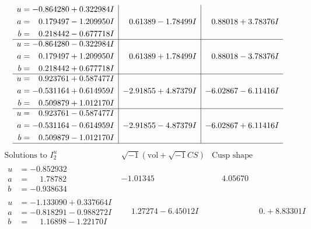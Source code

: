 \documentclass[1p]{elsarticle_modified}
\theoremstyle{definition}
\newcommand{\I}{\sqrt{-1}}
\begin{document}
$$\begin{array}{c|c|c}
\begin{aligned}
u &= -0.864280 + 0.322984 I \\
a &= \phantom{-}0.179497 - 1.209950 I \\
b &= \phantom{-}0.218442 - 0.677718 I\end{aligned}
 & \phantom{-}0.61389 - 1.78499 I & \phantom{-}0.88018 + 3.78376 I \\ \hline\begin{aligned}
u &= -0.864280 - 0.322984 I \\
a &= \phantom{-}0.179497 + 1.209950 I \\
b &= \phantom{-}0.218442 + 0.677718 I\end{aligned}
 & \phantom{-}0.61389 + 1.78499 I & \phantom{-}0.88018 - 3.78376 I \\ \hline\begin{aligned}
u &= \phantom{-}0.923761 + 0.587477 I \\
a &= -0.531164 + 0.614959 I \\
b &= \phantom{-}0.509879 + 1.012170 I\end{aligned}
 & -2.91855 + 4.87379 I & -6.02867 - 6.11416 I \\ \hline\begin{aligned}
u &= \phantom{-}0.923761 - 0.587477 I \\
a &= -0.531164 - 0.614959 I \\
b &= \phantom{-}0.509879 - 1.012170 I\end{aligned}
 & -2.91855 - 4.87379 I & -6.02867 + 6.11416 I\\
 \hline 
 \end{array}$$\newpage$$\begin{array}{c|c|c}  
\text{Solutions to }I^u_{2}& \I (\text{vol} + \sqrt{-1}CS) & \text{Cusp shape}\\
 \hline 
\begin{aligned}
u &= -0.852932\phantom{ +0.000000I} \\
a &= \phantom{-}1.78782\phantom{ +0.000000I} \\
b &= -0.938634\phantom{ +0.000000I}\end{aligned}
 & -1.01345\phantom{ +0.000000I} & \phantom{-}4.05670\phantom{ +0.000000I} \\ \hline\begin{aligned}
u &= -1.133090 + 0.337664 I \\
a &= -0.818291 - 0.988272 I \\
b &= \phantom{-}1.16898 - 1.22170 I\end{aligned}
 & \phantom{-}1.27274 - 6.45012 I & \phantom{-0.000000 -}0. + 8.83301 I \\ \hline\begin{aligned}

\end{aligned}
\end{array}$$
\end{document}
